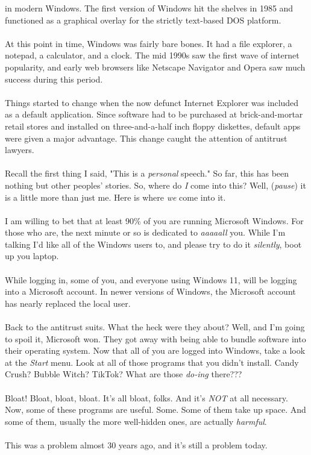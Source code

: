 \documentclass[11pt]{article}
\begin{document}
in modern Windows. The first version of Windows hit the shelves in 1985 and functioned as a
graphical overlay for the strictly text-based DOS platform.
\\
\\
At this point in time, Windows was fairly bare bones. It had a file explorer, a notepad, a 
calculator, and a clock. The mid 1990s saw the first wave of internet popularity, 
and early web browsers like Netscape Navigator and Opera saw much success during this period. 
\\
\\
Things started to change when the now defunct Internet Explorer was included as a default
application. Since software had to be purchased at brick-and-mortar retail stores and installed on
three-and-a-half inch floppy diskettes, default apps were given a major advantage. This 
change caught the attention of antitrust lawyers.
\\
\\
 Recall the first thing I said, "This is a \textit{personal} speech."
So far, this has been nothing but other peoples' stories. So, where do \textit{I} come into this?
Well, (\textit{pause}) it is a little more than just me. Here is where \textit{we} come into it.
\\
\\
I am willing to bet that at least 90\% of you are running Microsoft Windows. For those who are,
the next minute or so is dedicated to \textit{aaaaall} you. While I'm talking I'd like all of
the Windows users to, and please try to do it \textit{silently}, boot up you laptop.
\\
\\
While logging in, some of you, and everyone using Windows 11, will be logging into a Microsoft
account. In newer versions of Windows,  the Microsoft account has nearly replaced the local
user.
\\
\\
Back to the antitrust suits. What the heck were they about? Well, and I'm going to spoil it,
Microsoft won. They got away with being able to bundle software into their operating system.
Now that all of you are logged into Windows, take a look at the \textit{Start} menu. Look at
all of those programs that you didn't install. Candy Crush? Bubble Witch? TikTok? 
 What are those \textit{do-ing} there???
\\
\\
Bloat! Bloat, bloat, bloat. It's all bloat, folks. And it's \textit{NOT} at all necessary.
Now, some of these programs are useful. Some. Some of them take up space. And some of them,
usually the more well-hidden ones, are actually \textit{harmful}.
\\
\\
This was a problem almost 30 years ago, and it's still a problem today. 
\end{document}
